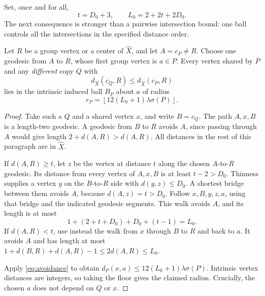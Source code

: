Set, once and for all,
\begin{equation}\label{eq:root-constants}
t=D_0+3,\qquad L_0=2+2t+2D_0.
\end{equation}
The next consequence is stronger than a pairwise intersection bound: one
ball controls all the intersections in the specified distance order.

\begin{lemma}\label{lem:overlap}
Let \(R\) be a group vertex or a center of \(\widehat X\), and let
\(A=c_P\ne R\). Choose one geodesic from \(A\) to \(R\), whose first
group vertex is \(a\in P\). Every vertex shared by \(P\) and any
\emph{different} copy \(Q\) with
\[
d_{\widehat X}(c_Q,R)\le d_{\widehat X}(c_P,R)
\]
lies in the intrinsic induced ball \(B_P\) about \(a\) of radius
\begin{equation}\label{eq:overlap-radius}
r_P=\left\lfloor12(L_0+1)\lambda\sigma(P)\right\rfloor.
\end{equation}
\end{lemma}

\begin{proof}
Take such a \(Q\) and a shared vertex \(x\), and write \(B=c_Q\).
The path \(A,x,B\) is a length-two geodesic. A geodesic from \(B\) to
\(R\) avoids \(A\), since passing through \(A\) would give length
\(2+d(A,R)>d(A,R)\). All distances in the rest of this paragraph are in
\(\widehat X\).

If \(d(A,R)\ge t\), let \(z\) be the vertex at distance \(t\) along the
chosen \(A\)-to-\(R\) geodesic. Its distance from every vertex of
\(A,x,B\) is at least \(t-2>D_0\). Thinness supplies a vertex \(y\) on
the \(B\)-to-\(R\) side with \(d(y,z)\le D_0\). A shortest bridge
between them avoids \(A\), because \(d(A,z)=t>D_0\). Follow
\(x,B,y,z,a\), using that bridge and the indicated geodesic segments.
This walk avoids \(A\), and its length is at most
\[
1+(2+t+D_0)+D_0+(t-1)=L_0.
\]
If \(d(A,R)<t\), use instead the walk from \(x\) through \(B\) to
\(R\) and back to \(a\). It avoids \(A\) and has length at most
\(1+d(B,R)+d(A,R)-1\le2d(A,R)\le L_0\).

Apply \eqref{eq:avoidance} to obtain
\(d_P(x,a)\le12(L_0+1)\lambda\sigma(P)\). Intrinsic vertex distances
are integers, so taking the floor gives the claimed radius. Crucially,
the chosen \(a\) does not depend on \(Q\) or \(x\).
\end{proof}
